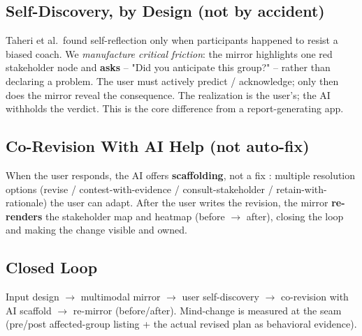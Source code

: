 \documentclass[manuscript,screen]{acmart}
\begin{document}
\subsection{Self-Discovery, by Design (not by accident)}
Taheri et al.\ found self-reflection only when participants happened to resist a biased
coach. We \emph{manufacture critical friction}: the mirror highlights one red
stakeholder node and \textbf{asks} -- "Did you anticipate this group?" -- rather than
declaring a problem. The user must actively predict / acknowledge; only then does the
mirror reveal the consequence. The realization is the user's; the AI withholds the
verdict. This is the core difference from a report-generating app.

\subsection{Co-Revision With AI Help (not auto-fix)}
When the user responds, the AI offers \textbf{scaffolding}, not a fix
\citep{taheri26}: multiple resolution options (revise / contest-with-evidence /
consult-stakeholder / retain-with-rationale) the user can adapt. After the user writes
the revision, the mirror \textbf{re-renders} the stakeholder map and heatmap
(before $\to$ after), closing the loop and making the change visible and owned.

\subsection{Closed Loop}
Input design $\to$ multimodal mirror $\to$ user self-discovery $\to$ co-revision with
AI scaffold $\to$ re-mirror (before/after). Mind-change is measured at the seam
(pre/post affected-group listing + the actual revised plan as behavioral evidence).
\end{document}
